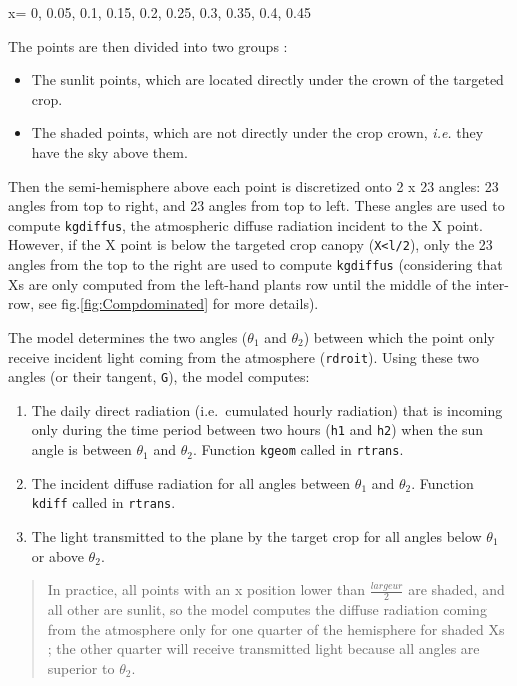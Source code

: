 \documentclass[
]{book}
\providecommand{\tightlist}{%
  \setlength{\itemsep}{0pt}\setlength{\parskip}{0pt}}
\begin{document}
x= 0, 0.05, 0.1, 0.15, 0.2, 0.25, 0.3, 0.35, 0.4, 0.45

The points are then divided into two groups :

\begin{itemize}
\tightlist
\item
  The sunlit points, which are located directly under the crown of the targeted crop.
\item
  The shaded points, which are not directly under the crop crown, \emph{i.e.} they have the sky above them.
\end{itemize}

Then the semi-hemisphere above each point is discretized onto 2 x 23 angles: 23 angles from top to right, and 23 angles from top to left.
These angles are used to compute \texttt{kgdiffus}, the atmospheric diffuse radiation incident to the X point. However, if the X point is below the targeted crop canopy (\texttt{X\textless{}l/2}), only the 23 angles from the top to the right are used to compute \texttt{kgdiffus} (considering that Xs are only computed from the left-hand plants row until the middle of the inter-row, see fig.\ref{fig:Compdominated} for more details).

The model determines the two angles (\(\theta_1\) and \(\theta_2\)) between which the point only receive incident light coming from the atmosphere (\texttt{rdroit}). Using these two angles (or their tangent, \texttt{G}), the model computes:

\begin{enumerate}
\def\labelenumi{\arabic{enumi}.}
\tightlist
\item
  The daily direct radiation (i.e.~cumulated hourly radiation) that is incoming only during the time period between two hours (\texttt{h1} and \texttt{h2}) when the sun angle is between \(\theta_1\) and \(\theta_2\). Function \texttt{kgeom} called in \texttt{rtrans}.
\item
  The incident diffuse radiation for all angles between \(\theta_1\) and \(\theta_2\). Function \texttt{kdiff} called in \texttt{rtrans}.
\item
  The light transmitted to the plane by the target crop for all angles below \(\theta_1\) or above \(\theta_2\).
\end{enumerate}

\begin{quote}
In practice, all points with an x position lower than \(\frac{largeur}{2}\) are shaded, and all other are sunlit, so the model computes the diffuse radiation coming from the atmosphere only for one quarter of the hemisphere for shaded Xs ; the other quarter will receive transmitted light because all angles are superior to \(\theta_2\).
\end{quote}
\end{document}
